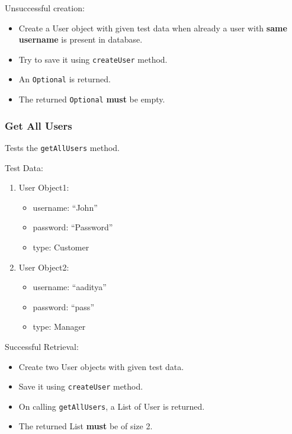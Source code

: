 \documentclass[]{article}
\providecommand{\tightlist}{%
  \setlength{\itemsep}{0pt}\setlength{\parskip}{0pt}}
\begin{document}
Unsuccessful creation:

\begin{itemize}
\tightlist
\item
  Create a User object with given test data when already a user with
  \textbf{same username} is present in database.
\item
  Try to save it using \texttt{createUser} method.
\item
  An \texttt{Optional} is returned.
\item
  The returned \texttt{Optional} \textbf{must} be empty.
\end{itemize}

\hypertarget{get-all-users}{%
\subsubsection{Get All Users}\label{get-all-users}}

Tests the \texttt{getAllUsers} method.

Test Data:

\begin{enumerate}
\def\labelenumi{\arabic{enumi}.}
\tightlist
\item
  User Object1:

  \begin{itemize}
  \tightlist
  \item
    username: ``John''
  \item
    password: ``Password''
  \item
    type: Customer
  \end{itemize}
\item
  User Object2:

  \begin{itemize}
  \tightlist
  \item
    username: ``aaditya''
  \item
    password: ``pass''
  \item
    type: Manager
  \end{itemize}
\end{enumerate}

Successful Retrieval:

\begin{itemize}
\tightlist
\item
  Create two User objects with given test data.
\item
  Save it using \texttt{createUser} method.
\item
  On calling \texttt{getAllUsers}, a List of User is returned.
\item
  The returned List \textbf{must} be of size 2.
\end{itemize}
\end{document}
